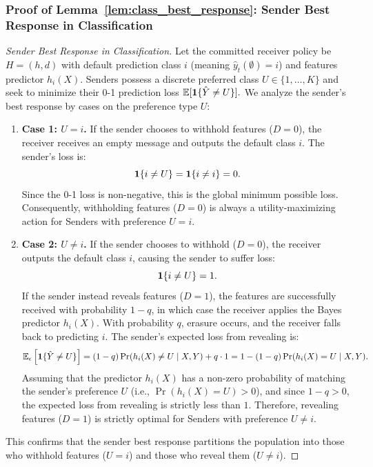 \subsubsection*{Proof of Lemma~\ref{lem:class_best_response}: Sender Best Response in Classification}
\label{app:proof_class_best_response}
\begin{proof}[Sender Best Response in Classification]
Let the committed receiver policy be $H = (h, d)$ with default prediction class $i$ (meaning $\hat{y}_t(\emptyset) = i$) and features predictor $h_i(X)$. Senders possess a discrete preferred class $U \in \{1, \dots, K\}$ and seek to minimize their 0-1 prediction loss $\mathbb{E}[\mathbf{1}\{\hat{Y} \ne U\}].$ We analyze the sender's best response by cases on the preference type $U$:
\begin{enumerate}
    \item \textbf{Case 1: $U = i$.} If the sender chooses to withhold features ($D = 0$), the receiver receives an empty message and outputs the default class $i$. The sender's loss is:
    \begin{equation}
        \mathbf{1}\{i \ne U\} = \mathbf{1}\{i \ne i\} = 0.
    \end{equation}
    Since the 0-1 loss is non-negative, this is the global minimum possible loss. Consequently, withholding features ($D = 0$) is always a utility-maximizing action for Senders with preference $U = i$.
    \item \textbf{Case 2: $U \ne i$.} If the sender chooses to withhold ($D = 0$), the receiver outputs the default class $i$, causing the sender to suffer loss:
    \begin{equation}
        \mathbf{1}\{i \ne U\} = 1.
    \end{equation}
    If the sender instead reveals features ($D = 1$), the features are successfully received with probability $1 - q$, in which case the receiver applies the Bayes predictor $h_i(X)$. With probability $q$, erasure occurs, and the receiver falls back to predicting $i$. The sender's expected loss from revealing is:
    \begin{equation}
        \mathbb{E}_{\epsilon}\left[ \mathbf{1}\{\hat{Y} \ne U\} \right] = (1 - q)\Pr(h_i(X) \ne U \mid X, Y) + q \cdot 1 = 1 - (1 - q)\Pr(h_i(X) = U \mid X, Y).
    \end{equation}
    Assuming that the predictor $h_i(X)$ has a non-zero probability of matching the sender's preference $U$ (i.e., $\Pr(h_i(X) = U) > 0$), and since $1 - q > 0$, the expected loss from revealing is strictly less than $1$. Therefore, revealing features ($D = 1$) is strictly optimal for Senders with preference $U \ne i$.
\end{enumerate}
This confirms that the sender best response partitions the population into those who withhold features ($U = i$) and those who reveal them ($U \ne i$).
\end{proof}

